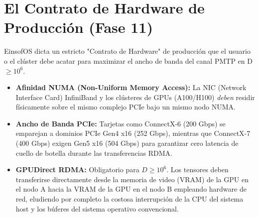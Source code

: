 \section{El Contrato de Hardware de Producción (Fase 11)}
EinsofOS dicta un estricto "Contrato de Hardware" de producción que el usuario o el clúster debe acatar para maximizar el ancho de banda del canal PMTP en D $\ge 10^6$.
\begin{itemize}
    \item \textbf{Afinidad NUMA (Non-Uniform Memory Access):} La NIC (Network Interface Card) InfiniBand y los clústeres de GPUs (A100/H100) \textit{deben} residir físicamente sobre el mismo complejo PCIe bajo un mismo nodo NUMA.
    \item \textbf{Ancho de Banda PCIe:} Tarjetas como ConnectX-6 (200 Gbps) se emparejan a dominios PCIe Gen4 x16 (252 Gbps), mientras que ConnectX-7 (400 Gbps) exigen Gen5 x16 (504 Gbps) para garantizar cero latencia de cuello de botella durante las transferencias RDMA.
    \item \textbf{GPUDirect RDMA:} Obligatorio para $D \ge 10^6$. Los tensores deben transferirse directamente desde la memoria de video (VRAM) de la GPU en el nodo A hacia la VRAM de la GPU en el nodo B empleando hardware de red, eludiendo por completo la costosa interrupción de la CPU del sistema host y los búferes del sistema operativo convencional.
\end{itemize}
